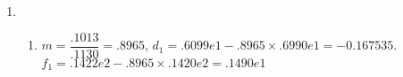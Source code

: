 \documentclass[12pt]{article}
\begin{document}
\begin{enumerate}
    \item \begin{enumerate}
        \item $m = \dfrac{.1013}{.1130} = .8965$, $d_1 = .6099e1 - .8965\times .6990e1 = -0.167535$.
        $f_1 = .1422e2 - .8965 \times .1420e2 = .1490e1$
    \end{enumerate}
\end{enumerate}
\end{document}
